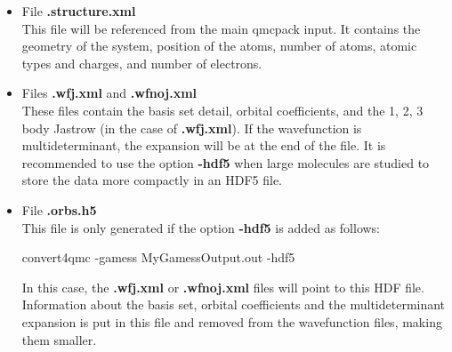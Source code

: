 \begin{itemize}
\begin{shade}
\end{shade}

 \item File \textbf{.structure.xml} \\
 This file will be referenced from the main qmcpack input. It contains the geometry of the system, position of the atoms, number of atoms, atomic types and charges, and number of electrons.
 
 \item Files \textbf{.wfj.xml} and \textbf{.wfnoj.xml}\\
 These files contain the basis set detail, orbital coefficients, and the 1, 2, 3 body Jastrow (in the case of \textbf{.wfj.xml}). If the wavefunction is multideterminant, the expansion will be at the end of the file. It is recommended to use the option \textbf{-hdf5} when large molecules are studied to store the data more compactly in an HDF5 file.
 
 \item File \textbf{.orbs.h5} \\
 This file is only generated if the option \textbf{-hdf5} is added as follows:
 \begin{shade}
  convert4qmc -gamess MyGamessOutput.out -hdf5
 \end{shade}
In this case,  the \textbf{.wfj.xml} or \textbf{.wfnoj.xml} files will point to this HDF file.  Information about the basis set, orbital coefficients and the multideterminant expansion is put in this file and removed from the wavefunction files, making them smaller. 

\end{itemize}



